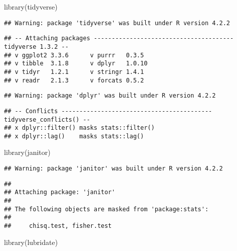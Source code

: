 \documentclass[
]{article}
\newenvironment{Shaded}{\begin{snugshade}}{\end{snugshade}}
\newcommand{\FunctionTok}[1]{\textcolor[rgb]{0.00,0.00,0.00}{#1}}
\newcommand{\NormalTok}[1]{#1}
\begin{document}
\begin{Shaded}
\begin{Highlighting}[]
  \FunctionTok{library}\NormalTok{(tidyverse)}
\end{Highlighting}
\end{Shaded}

\begin{verbatim}
## Warning: package 'tidyverse' was built under R version 4.2.2
\end{verbatim}

\begin{verbatim}
## -- Attaching packages --------------------------------------- tidyverse 1.3.2 --
## v ggplot2 3.3.6      v purrr   0.3.5 
## v tibble  3.1.8      v dplyr   1.0.10
## v tidyr   1.2.1      v stringr 1.4.1 
## v readr   2.1.3      v forcats 0.5.2
\end{verbatim}

\begin{verbatim}
## Warning: package 'dplyr' was built under R version 4.2.2
\end{verbatim}

\begin{verbatim}
## -- Conflicts ------------------------------------------ tidyverse_conflicts() --
## x dplyr::filter() masks stats::filter()
## x dplyr::lag()    masks stats::lag()
\end{verbatim}

\begin{Shaded}
\begin{Highlighting}[]
  \FunctionTok{library}\NormalTok{(janitor)}
\end{Highlighting}
\end{Shaded}

\begin{verbatim}
## Warning: package 'janitor' was built under R version 4.2.2
\end{verbatim}

\begin{verbatim}
## 
## Attaching package: 'janitor'
## 
## The following objects are masked from 'package:stats':
## 
##     chisq.test, fisher.test
\end{verbatim}

\begin{Shaded}
\begin{Highlighting}[]
  \FunctionTok{library}\NormalTok{(lubridate)}
\end{Highlighting}
\end{Shaded}
\end{document}
